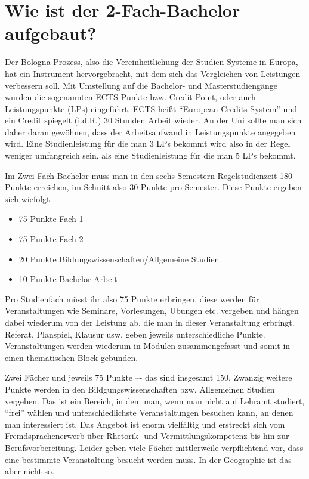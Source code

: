 \section*{Wie ist der 2-Fach-Bachelor aufgebaut?}
Der Bologna-Prozess, also die Vereinheitlichung der Studien-Systeme in Europa, hat ein Instrument hervorgebracht, mit dem sich das Vergleichen von Leistungen verbessern soll. Mit Umstellung auf die Bachelor- und Masterstudiengänge wurden die sogenannten ECTS-Punkte bzw. Credit Point, oder auch Leistungspunkte (LPs) eingeführt. ECTS heißt "`European Credits System"' und ein Credit spiegelt (i.d.R.) 30 Stunden Arbeit wieder. An der Uni sollte man sich daher daran gewöhnen, dass der Arbeitsaufwand in Leistungspunkte angegeben wird. Eine Studienleistung für die man 3 LPs bekommt wird also in der Regel weniger umfangreich sein, als eine Studienleistung für die man 5 LPs bekommt.

Im Zwei-Fach-Bachelor muss man in den sechs Semestern Regelstudienzeit 180 Punkte erreichen, im Schnitt also 30 Punkte pro Semester. Diese Punkte ergeben sich wiefolgt:
\begin{itemize}
\item 75 Punkte Fach 1
\item 75 Punkte Fach 2
\item 20 Punkte Bildungswissenschaften/Allgemeine Studien
\item 10 Punkte Bachelor-Arbeit
\end{itemize}
Pro Studienfach müsst ihr also 75 Punkte erbringen, diese werden für Veranstaltungen wie Seminare, Vorlesungen, Übungen etc. vergeben und hängen dabei wiederum von der Leistung ab, die man in dieser Veranstaltung erbringt. Referat, Planspiel, Klausur usw. geben jeweils unterschiedliche Punkte. Veranstaltungen werden wiederum in Modulen zusammengefasst und somit in einen thematischen Block gebunden.

Zwei Fächer und jeweils 75 Punkte –- das sind insgesamt 150. Zwanzig weitere Punkte werden in den Bildgungswissenschaften bzw. Allgemeinen Studien vergeben. Das ist ein Bereich, in dem man, wenn man nicht auf Lehramt studiert, "`frei"' wählen und unterschiedlichste Veranstaltungen besuchen kann, an denen man interessiert ist. Das Angebot ist enorm vielfältig und erstreckt sich vom Fremdsprachenerwerb über Rhetorik- und Vermittlungskompetenz bis hin zur Berufsvorbereitung. Leider geben viele Fächer mittlerweile verpflichtend vor, dass eine bestimmte Veranstaltung besucht werden muss. In der Geographie ist das aber nicht so.

